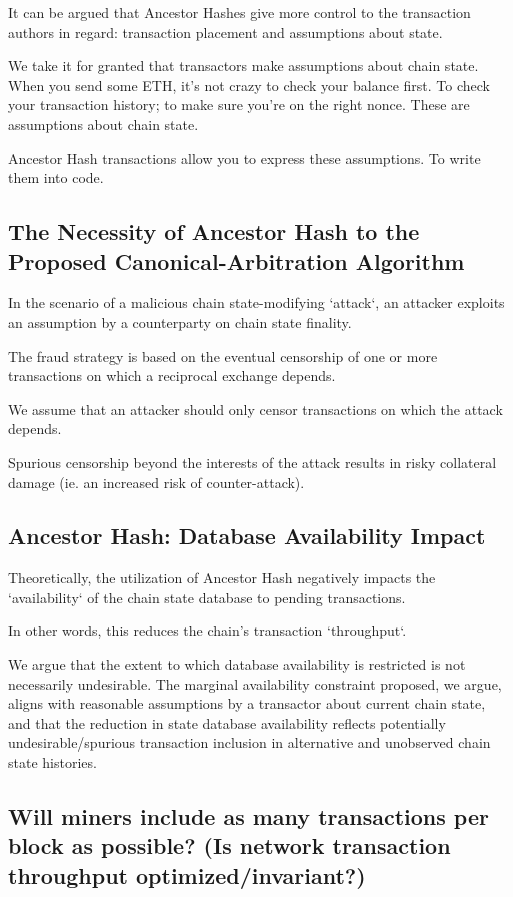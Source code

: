 \documentclass[11pt]{article}
\theoremstyle{plain}
\begin{document}
{It can be argued that Ancestor Hashes give more control to the transaction
authors in regard: transaction placement and assumptions about state.

We take it for granted that transactors make assumptions about chain state.
When you send some ETH, it's not crazy to check your balance first. To check
your transaction history; to make sure you're on the right nonce.
These are assumptions about chain state. 

Ancestor Hash transactions allow you to express these assumptions. To write
them into code.

\subsection{\small{The Necessity of Ancestor Hash to the Proposed
Canonical-Arbitration Algorithm}}

In the scenario of a malicious chain state-modifying `attack`, an attacker
exploits an assumption by a counterparty on chain state finality.

The fraud strategy is based on the eventual censorship of one or more
transactions on which a reciprocal exchange depends.

We assume that an attacker should only censor transactions on which the attack
depends.

Spurious censorship beyond the interests of the attack results in risky
collateral damage (ie. an increased risk of counter-attack).


\subsection{\small{Ancestor Hash: Database Availability Impact}}

Theoretically, the utilization of Ancestor Hash negatively impacts the
`availability` of the chain state database to pending transactions.

In other words, this reduces the chain's transaction `throughput`.

We argue that the extent to which database availability is restricted is not
necessarily undesirable.
The marginal availability constraint proposed, we argue, aligns with reasonable
assumptions by a transactor about current chain state,
and that the reduction in state database availability reflects potentially
undesirable/spurious transaction inclusion in alternative
and unobserved chain state histories.

\subsection{\small{Will miners include as many transactions per block as
possible? (Is network transaction throughput optimized/invariant?)}}


}
\end{document}
